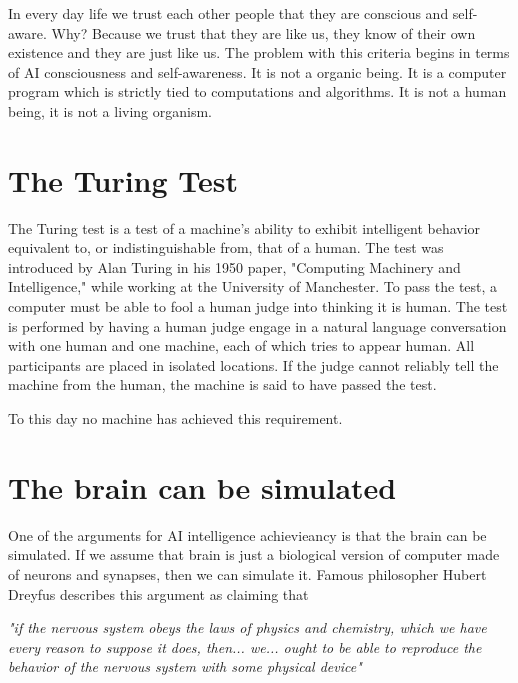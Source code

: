 \documentclass[12pt]{extarticle}
\begin{document}
In every day life we trust each other people that they are conscious and self-aware. Why? Because we trust that they are like us, they know of their own existence and they are just like us.
The problem with this criteria begins in terms of AI consciousness and self-awareness. It is not a organic being.
It is a computer program which is strictly tied to computations and algorithms. It is not a human being, it is not a living organism.


\section{The Turing Test}
The Turing test is a test of a machine's ability to exhibit intelligent behavior equivalent to, or indistinguishable from, that of a human.
The test was introduced by Alan Turing in his 1950 paper, "Computing Machinery and Intelligence," while working at the University of Manchester.
To pass the test, a computer must be able to fool a human judge into thinking it is human. The test is performed by having a human judge engage in a natural language conversation with one human and one machine, 
each of which tries to appear human.
All participants are placed in isolated locations. If the judge cannot reliably tell the machine from the human, the machine is said to have passed the test.


To this day no machine has achieved this requirement.


\section{The brain can be simulated}
One of the arguments for AI intelligence achievieancy is that the brain can be simulated.
If we assume that brain is just a biological version of computer made of neurons and synapses, then we can simulate it.
Famous philosopher Hubert Dreyfus describes this argument as claiming that  
\begin{center}
    \textit{"if the nervous system obeys the laws of physics and chemistry, which we have every reason to suppose it does, then... we... ought to be able to reproduce the behavior of the nervous system with some physical device"}
\end{center}
\end{document}
